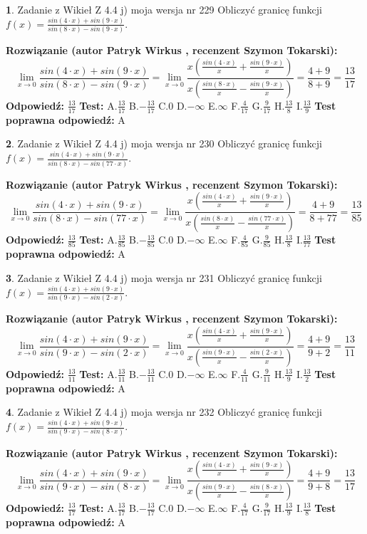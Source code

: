 \documentclass[12pt, a4paper]{article}
\theoremstyle{definition} %
\newtheorem{zad}{}
\newcommand{\zadStart}[1]{\begin{zad}#1\newline}
\newcommand{\zadStop}{\end{zad}}
\newcommand{\rozwStart}[2]{\noindent \textbf{Rozwiązanie (autor #1 , recenzent #2): }\newline}
\newcommand{\rozwStop}{\newline}
\newcommand{\odpStart}{\noindent \textbf{Odpowiedź:}\newline}
\newcommand{\odpStop}{\newline}
\newcommand{\testStart}{\noindent \textbf{Test:}\newline}
\newcommand{\testStop}{\newline}
\newcommand{\kluczStart}{\noindent \textbf{Test poprawna odpowiedź:}\newline}
\newcommand{\kluczStop}{\newline}
\begin{document}
\zadStart{Zadanie z Wikieł Z 4.4 j) moja wersja nr 229}
Obliczyć granicę funkcji $f(x)=\frac{sin(4\cdot x) +sin(9\cdot x)}{sin(8\cdot x) -sin(9\cdot x)}$.
\zadStop
\rozwStart{Patryk Wirkus}{Szymon Tokarski}
$$\lim\limits_{x\to 0}\frac{sin(4\cdot x) +sin(9\cdot x)}{sin(8\cdot x) -sin(9\cdot x)}=\lim\limits_{x\to 0}\frac{x(\frac{sin(4\cdot x)}{x}+\frac{sin(9\cdot x)}{x})}{x(\frac{sin(8\cdot x)}{x}-\frac{sin(9\cdot x)}{x})}=\frac{4+9}{8+9} = \frac{13}{17}$$
\rozwStop
\odpStart
$\frac{13}{17}$
\odpStop
\testStart
A.$\frac{13}{17}$
B.$-\frac{13}{17}$
C.$0$
D.$-\infty$
E.$\infty$
F.$\frac{4}{17}$
G.$\frac{9}{17}$
H.$\frac{13}{8}$
I.$\frac{13}{9}$
\testStop
\kluczStart
A
\kluczStop



\zadStart{Zadanie z Wikieł Z 4.4 j) moja wersja nr 230}
Obliczyć granicę funkcji $f(x)=\frac{sin(4\cdot x) +sin(9\cdot x)}{sin(8\cdot x) -sin(77\cdot x)}$.
\zadStop
\rozwStart{Patryk Wirkus}{Szymon Tokarski}
$$\lim\limits_{x\to 0}\frac{sin(4\cdot x) +sin(9\cdot x)}{sin(8\cdot x) -sin(77\cdot x)}=\lim\limits_{x\to 0}\frac{x(\frac{sin(4\cdot x)}{x}+\frac{sin(9\cdot x)}{x})}{x(\frac{sin(8\cdot x)}{x}-\frac{sin(77\cdot x)}{x})}=\frac{4+9}{8+77} = \frac{13}{85}$$
\rozwStop
\odpStart
$\frac{13}{85}$
\odpStop
\testStart
A.$\frac{13}{85}$
B.$-\frac{13}{85}$
C.$0$
D.$-\infty$
E.$\infty$
F.$\frac{4}{85}$
G.$\frac{9}{85}$
H.$\frac{13}{8}$
I.$\frac{13}{77}$
\testStop
\kluczStart
A
\kluczStop



\zadStart{Zadanie z Wikieł Z 4.4 j) moja wersja nr 231}
Obliczyć granicę funkcji $f(x)=\frac{sin(4\cdot x) +sin(9\cdot x)}{sin(9\cdot x) -sin(2\cdot x)}$.
\zadStop
\rozwStart{Patryk Wirkus}{Szymon Tokarski}
$$\lim\limits_{x\to 0}\frac{sin(4\cdot x) +sin(9\cdot x)}{sin(9\cdot x) -sin(2\cdot x)}=\lim\limits_{x\to 0}\frac{x(\frac{sin(4\cdot x)}{x}+\frac{sin(9\cdot x)}{x})}{x(\frac{sin(9\cdot x)}{x}-\frac{sin(2\cdot x)}{x})}=\frac{4+9}{9+2} = \frac{13}{11}$$
\rozwStop
\odpStart
$\frac{13}{11}$
\odpStop
\testStart
A.$\frac{13}{11}$
B.$-\frac{13}{11}$
C.$0$
D.$-\infty$
E.$\infty$
F.$\frac{4}{11}$
G.$\frac{9}{11}$
H.$\frac{13}{9}$
I.$\frac{13}{2}$
\testStop
\kluczStart
A
\kluczStop



\zadStart{Zadanie z Wikieł Z 4.4 j) moja wersja nr 232}
Obliczyć granicę funkcji $f(x)=\frac{sin(4\cdot x) +sin(9\cdot x)}{sin(9\cdot x) -sin(8\cdot x)}$.
\zadStop
\rozwStart{Patryk Wirkus}{Szymon Tokarski}
$$\lim\limits_{x\to 0}\frac{sin(4\cdot x) +sin(9\cdot x)}{sin(9\cdot x) -sin(8\cdot x)}=\lim\limits_{x\to 0}\frac{x(\frac{sin(4\cdot x)}{x}+\frac{sin(9\cdot x)}{x})}{x(\frac{sin(9\cdot x)}{x}-\frac{sin(8\cdot x)}{x})}=\frac{4+9}{9+8} = \frac{13}{17}$$
\rozwStop
\odpStart
$\frac{13}{17}$
\odpStop
\testStart
A.$\frac{13}{17}$
B.$-\frac{13}{17}$
C.$0$
D.$-\infty$
E.$\infty$
F.$\frac{4}{17}$
G.$\frac{9}{17}$
H.$\frac{13}{9}$
I.$\frac{13}{8}$
\testStop
\kluczStart
A
\kluczStop
\end{document}
